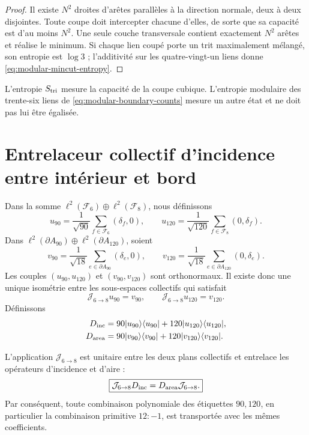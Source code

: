 \begin{proof}
Il existe \(N^2\) droites d'arêtes parallèles à la direction normale, deux à deux
disjointes. Toute coupe doit intercepter chacune d'elles, de sorte que sa capacité
est d'au moins \(N^2\). Une seule couche transversale contient exactement
\(N^2\) arêtes et réalise le minimum. Si chaque lien coupé porte un trit
maximalement mélangé, son entropie est \(\log3\) ; l'additivité sur les
quatre-vingt-un liens donne \cref{eq:modular-mincut-entropy}.
\end{proof}

L'entropie \(S_{\rm tri}\) mesure la capacité de la coupe cubique.
L'entropie modulaire des trente-six liens de
\cref{eq:modular-boundary-counts} mesure un autre état et ne doit pas lui être
égalisée.

\section{Entrelaceur collectif d'incidence entre intérieur et bord}

Dans la somme
\(\ell^2(\mathcal F_6)\oplus\ell^2(\mathcal F_8)\), nous définissons
\begin{equation}
\label{eq:modular-u90-u120}
u_{90}=\frac1{\sqrt{90}}\sum_{f\in\mathcal F_6}(\delta_f,0),
\qquad
u_{120}=\frac1{\sqrt{120}}\sum_{f\in\mathcal F_8}(0,\delta_f).
\end{equation}
Dans
\(\ell^2(\partial A_{90})\oplus\ell^2(\partial A_{120})\), soient
\begin{equation}
\label{eq:modular-v90-v120}
v_{90}=\frac1{\sqrt{18}}\sum_{e\in\partial A_{90}}(\delta_e,0),
\qquad
v_{120}=\frac1{\sqrt{18}}\sum_{e\in\partial A_{120}}(0,\delta_e).
\end{equation}
Les couples \((u_{90},u_{120})\) et \((v_{90},v_{120})\) sont orthonormaux.
Il existe donc une unique isométrie entre les sous-espaces collectifs
qui satisfait
\begin{equation}
\label{eq:modular-J68}
\mathcal J_{6\to8}u_{90}=v_{90},
\qquad
\mathcal J_{6\to8}u_{120}=v_{120}.
\end{equation}
Définissons
\begin{align}
D_{\rm inc}
&=90|u_{90}\rangle\langle u_{90}|
+120|u_{120}\rangle\langle u_{120}|,
\label{eq:modular-Dinc}\\
D_{\rm area}
&=90|v_{90}\rangle\langle v_{90}|
+120|v_{120}\rangle\langle v_{120}|.
\label{eq:modular-Darea}
\end{align}

\begin{theorem}
\label{thm:modular-J68}
L'application \(\mathcal J_{6\to8}\) est unitaire entre les deux plans
collectifs et entrelace les opérateurs d'incidence et d'aire :
\begin{equation}
\label{eq:modular-J-intertwining}
\boxed{
\mathcal J_{6\to8}D_{\rm inc}
=D_{\rm area}\mathcal J_{6\to8}.}
\end{equation}
Par conséquent, toute combinaison polynomiale des étiquettes \(90,120\), en
particulier la combinaison primitive \(12:-1\), est transportée avec les
mêmes coefficients.
\end{theorem}

